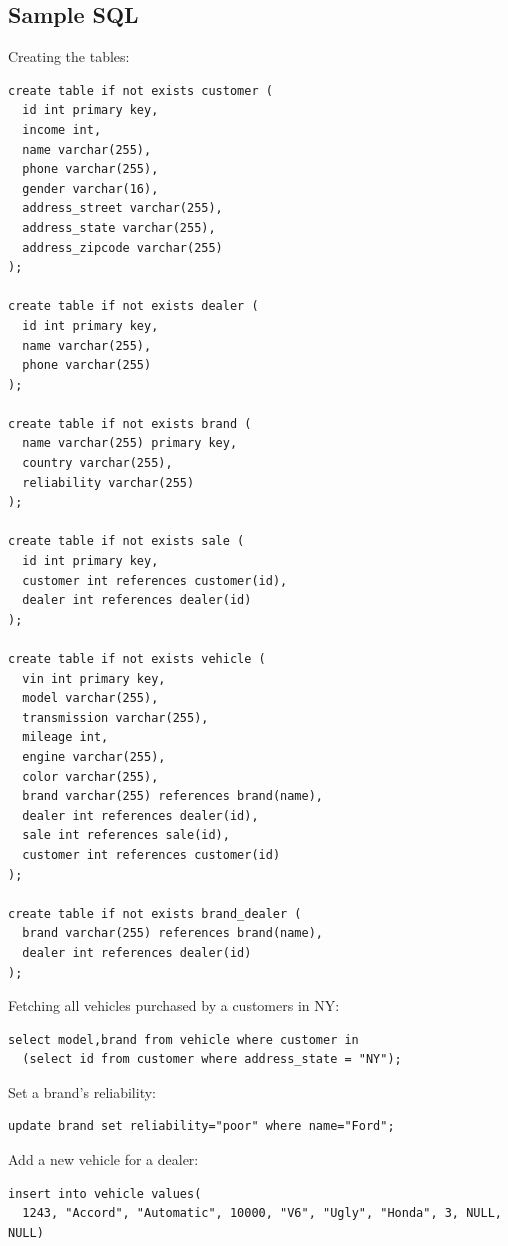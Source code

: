 \documentclass{math}
\begin{document}
\subsection*{Sample SQL}
Creating the tables:
\begin{lstlisting}
create table if not exists customer (
  id int primary key,
  income int,
  name varchar(255),
  phone varchar(255),
  gender varchar(16),
  address_street varchar(255),
  address_state varchar(255),
  address_zipcode varchar(255)
);

create table if not exists dealer (
  id int primary key,
  name varchar(255),
  phone varchar(255)
);

create table if not exists brand (
  name varchar(255) primary key,
  country varchar(255),
  reliability varchar(255)
);

create table if not exists sale (
  id int primary key,
  customer int references customer(id),
  dealer int references dealer(id)
);

create table if not exists vehicle (
  vin int primary key,
  model varchar(255),
  transmission varchar(255),
  mileage int,
  engine varchar(255),
  color varchar(255),
  brand varchar(255) references brand(name),
  dealer int references dealer(id),
  sale int references sale(id),
  customer int references customer(id)
);

create table if not exists brand_dealer (
  brand varchar(255) references brand(name),
  dealer int references dealer(id)
);
\end{lstlisting}
Fetching all vehicles purchased by a customers in NY:
\begin{lstlisting}
select model,brand from vehicle where customer in
  (select id from customer where address_state = "NY");
\end{lstlisting}
Set a brand's reliability:
\begin{lstlisting}
update brand set reliability="poor" where name="Ford";
\end{lstlisting}
Add a new vehicle for a dealer:
\begin{lstlisting}
insert into vehicle values(
  1243, "Accord", "Automatic", 10000, "V6", "Ugly", "Honda", 3, NULL, NULL)
\end{lstlisting}
\end{document}

